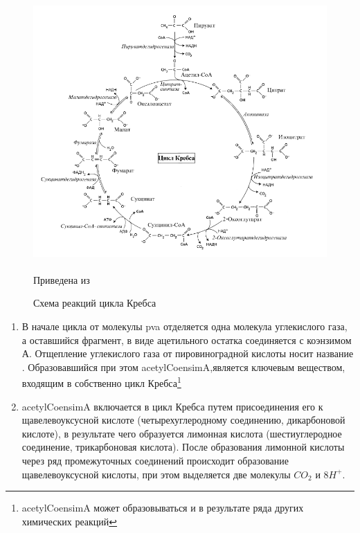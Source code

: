 \begin{figure}
  \centering
       \includegraphics[width=1\linewidth]{pictures/krebs_cycle}
\caption{Схема реакций цикла Кребса}
\paragraph*{}Приведена из \cite{medvedev_2012}
\label{krebs_cycle}
\end{figure}

\begin{enumerate}

\item В начале цикла от молекулы \gls{pva} отделяется одна молекула углекислого газа, а оставшийся фрагмент, в виде ацетильного остатка соединяется с коэнзимом А. Отщепление углекислого газа от пировиноградной кислоты носит название . Образовавшийся при этом \gls{acetylCoensimA},является ключевым веществом, входящим в собственно цикл Кребса\footnote{\gls{acetylCoensimA} может образовываться и в результате ряда других химических реакций}

\item \gls{acetylCoensimA} включается в цикл Кребса путем присоединения его к щавелевоуксусной кислоте (четырехуглеродному соединению, дикарбоновой кислоте), в результате чего образуется лимонная кислота (шестиуглеродное соединение, трикарбоновая кислота). После образования лимонной кислоты через ряд промежуточных соединений происходит образование 
щавелевоуксусной кислоты, при этом выделяется две молекулы $CO_{2}$ и 8$H^{+}$.

\end{enumerate}

